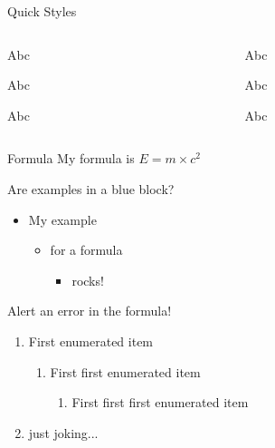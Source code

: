 \documentclass[aspectratio=43]{beamer}
\begin{document}
\begin{frame}{Quick Styles}
\begin{columns}
    \begin{column}{0.12\paperwidth}
    \begin{yellow0block}{Abc}
    \end{yellow0block}
    \begin{yellow1block}{Abc}
    \end{yellow1block}
    \begin{yellow2block}{Abc}
    \end{yellow2block}
    \end{column}

    \begin{column}{0.12\paperwidth}
    \begin{red0block}{Abc}
    \end{red0block}
    \begin{red1block}{Abc}
    \end{red1block}
    \begin{red2block}{Abc}
    \end{red2block}
    \end{column}

\end{columns}
\end{frame}

\begin{frame}{Formula}
    My formula is $E=m\times c^2$
    \begin{blue2block}{Are examples in a blue block?}
    \begin{itemize}
        \item My example
        \begin{itemize}
            \item for a formula
            \begin{itemize}
                \item rocks!
            \end{itemize}
        \end{itemize}
    \end{itemize}
    \end{blue2block}

    \begin{red2block}{Alert an error in the formula!}
    \begin{enumerate}
        \item First enumerated item
        \begin{enumerate}
            \item First first enumerated item
            \begin{enumerate}
                \item First first first enumerated item
            \end{enumerate}
        \end{enumerate}
        \item just joking...
    \end{enumerate}
    \end{red2block}
\end{frame}

\end{document}
